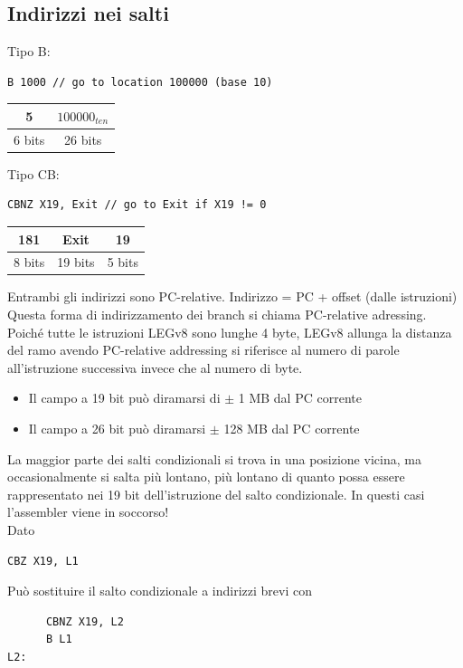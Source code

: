 \documentclass[12pt,a4paper]{article}
\begin{document}
\subsection{Indirizzi nei salti}
Tipo B: \begin{minipage}{.2\linewidth}
\begin{verbatim}
B 1000 // go to location 100000 (base 10)
\end{verbatim}
\end{minipage}
\begin{center}\begin{tabular}{cc}
\hline
\multicolumn{1}{|c|}{5} & \multicolumn{1}{c|}{$100000_{ten}$}\\ \hline
6 bits & 26 bits                 
\end{tabular}\end{center}
Tipo CB: \begin{minipage}{.2\linewidth}
\begin{verbatim}
CBNZ X19, Exit // go to Exit if X19 != 0
\end{verbatim}
\end{minipage}
\begin{center}\begin{tabular}{ccc}
\hline
\multicolumn{1}{|c|}{181} & \multicolumn{1}{c|}{Exit} & \multicolumn{1}{c|}{19} \\ \hline
8 bits & 19 bits & 5 bits                   
\end{tabular}\end{center}
Entrambi gli indirizzi sono PC-relative. Indirizzo = PC + offset (dalle istruzioni)\\
Questa forma di indirizzamento dei branch si chiama PC-relative adressing.\\
Poiché tutte le istruzioni LEGv8 sono lunghe 4 byte, LEGv8 allunga la distanza del ramo avendo PC-relative addressing si riferisce al numero di parole all'istruzione successiva invece che al numero di byte.
\begin{itemize}
\item Il campo a 19 bit può diramarsi di $\pm$ 1 MB dal PC corrente
\item Il campo a 26 bit può diramarsi $\pm$ 128 MB dal PC corrente
\end{itemize}
La maggior parte dei salti condizionali si trova in una posizione vicina, ma occasionalmente si salta più lontano, più lontano di quanto possa essere rappresentato nei 19 bit dell'istruzione del salto condizionale. In questi casi l'assembler viene in soccorso!\\
Dato \begin{center}\begin{minipage}{.2\linewidth}
\begin{verbatim}
CBZ X19, L1
\end{verbatim}
\end{minipage}\end{center}
Può sostituire il salto condizionale a indirizzi brevi con
\begin{verbatim}
      CBNZ X19, L2
      B L1
L2:
\end{verbatim}
\end{document}
